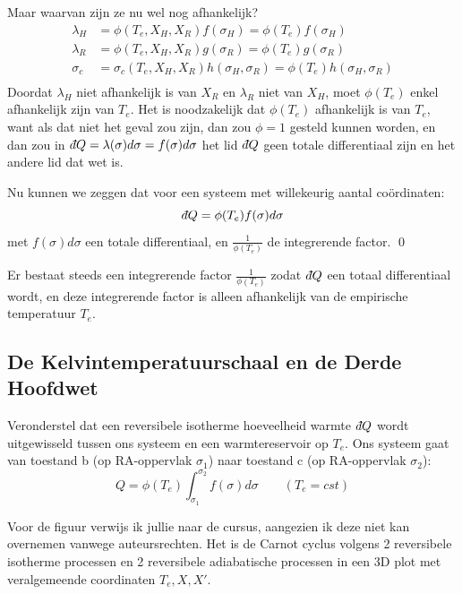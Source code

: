 \begin{derivation}
Maar waarvan zijn ze nu wel nog afhankelijk?
\begin{align*}
    \lambda_H &= \phi(T_e, X_H, X_R) f(\sigma_H) = \phi(T_e)f(\sigma_H) \\
    \lambda_R &= \phi(T_e, X_H, X_R) g(\sigma_R) = \phi(T_e)g(\sigma_R) \\
    \sigma_c &= \sigma_c(T_e, X_H, X_R) h(\sigma_H, \sigma_R) = \phi(T_e)h(\sigma_H, \sigma_R) \\ 
\end{align*}
Doordat \(\lambda_H\) niet afhankelijk is van \(X_R\) en \(\lambda_R\) niet van \(X_H\), moet \(\phi(T_e)\) enkel afhankelijk zijn van \(T_e\).
Het is noodzakelijk dat \(\phi(T_e)\) afhankelijk is van \(T_e\), want als dat niet het geval zou zijn, dan zou \(\phi = 1\) gesteld kunnen worden, en dan zou in \(\dbar Q = \lambda(\sigma) d\sigma = f(\sigma)d\sigma\) het lid \(\dbar Q\) geen totale differentiaal zijn en het andere lid dat wet is.

Nu kunnen we zeggen dat voor een systeem met willekeurig aantal coördinaten:
\[\dbar Q = \phi(T_e)f(\sigma) d\sigma\]
met \(f(\sigma)d\sigma\) een totale differentiaal, en \(\frac{1}{\phi(T_e)}\) de integrerende factor.
\qed
\end{derivation}

\begin{postulate}
    Er bestaat steeds een integrerende factor \(\frac{1}{\phi(T_e)}\) zodat \(\dbar Q\) een totaal differentiaal wordt, en deze integrerende factor is alleen afhankelijk van de empirische temperatuur \(T_e\).
\end{postulate}

\subsection{De Kelvintemperatuurschaal en de Derde Hoofdwet}

Veronderstel dat een reversibele isotherme hoeveelheid warmte \(\dbar Q\) wordt uitgewisseld tussen ons systeem en een warmtereservoir op \(T_e\). 
Ons systeem gaat van toestand b (op RA-oppervlak \(\sigma_1\)) naar toestand c (op RA-oppervlak \(\sigma_2\)):
\[
Q = \phi(T_e) \int_{\sigma_1}^{\sigma_2}f(\sigma)d\sigma  \qquad (T_e = cst)
\]

Voor de figuur verwijs ik jullie naar de cursus, aangezien ik deze niet kan overnemen vanwege auteursrechten. 
Het is de Carnot cyclus volgens 2 reversibele isotherme processen en 2 reversibele adiabatische processen in een 3D plot met veralgemeende coordinaten \(T_e, X, X'\).

